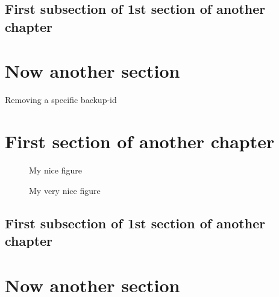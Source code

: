 \documentclass{book}
\begin{document}
\subsection{First subsection of 1st section of another chapter}

\section{Now another section}















Removing a specific backup-id






\section{First section of another chapter}

\begin{figure}
\caption{My nice figure}
\end{figure}

\begin{figure}
\caption{My very nice figure}
\end{figure}


\subsection{First subsection of 1st section of another chapter}

\section{Now another section}
\end{document}

